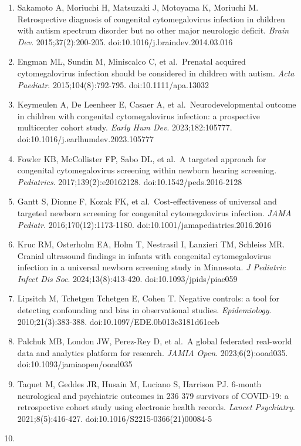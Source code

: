 \documentclass[11pt]{article}
\begin{document}
{\begin{enumerate}
  2018;48(5):1483-1491. doi:10.1007/s10803-017-3412-x
\item
  Sakamoto A, Moriuchi H, Matsuzaki J, Motoyama K, Moriuchi M. Retrospective diagnosis of congenital cytomegalovirus infection in children with autism spectrum disorder but no other major neurologic
  deficit. \emph{Brain Dev}. 2015;37(2):200-205. doi:10.1016/j.braindev.2014.03.016
\item
  Engman ML, Sundin M, Miniscalco C, et al.~Prenatal acquired cytomegalovirus infection should be considered in children with autism. \emph{Acta Paediatr}. 2015;104(8):792-795. doi:10.1111/apa.13032
\item
  Keymeulen A, De Leenheer E, Casaer A, et al.~Neurodevelopmental outcome in children with congenital cytomegalovirus infection: a prospective multicenter cohort study. \emph{Early Hum Dev}.
  2023;182:105777. doi:10.1016/j.earlhumdev.2023.105777
\item
  Fowler KB, McCollister FP, Sabo DL, et al.~A targeted approach for congenital cytomegalovirus screening within newborn hearing screening. \emph{Pediatrics}. 2017;139(2):e20162128.
  doi:10.1542/peds.2016-2128
\item
  Gantt S, Dionne F, Kozak FK, et al.~Cost-effectiveness of universal and targeted newborn screening for congenital cytomegalovirus infection. \emph{JAMA Pediatr}. 2016;170(12):1173-1180.
  doi:10.1001/jamapediatrics.2016.2016
\item
  Kruc RM, Osterholm EA, Holm T, Nestrasil I, Lanzieri TM, Schleiss MR. Cranial ultrasound findings in infants with congenital cytomegalovirus infection in a universal newborn screening study in
  Minnesota. \emph{J Pediatric Infect Dis Soc}. 2024;13(8):413-420. doi:10.1093/jpids/piae059
\item
  Lipsitch M, Tchetgen Tchetgen E, Cohen T. Negative controls: a tool for detecting confounding and bias in observational studies. \emph{Epidemiology}. 2010;21(3):383-388.
  doi:10.1097/EDE.0b013e3181d61eeb
\item
  Palchuk MB, London JW, Perez-Rey D, et al.~A global federated real-world data and analytics platform for research. \emph{JAMIA Open}. 2023;6(2):ooad035. doi:10.1093/jamiaopen/ooad035
\item
  Taquet M, Geddes JR, Husain M, Luciano S, Harrison PJ. 6-month neurological and psychiatric outcomes in 236 379 survivors of COVID-19: a retrospective cohort study using electronic health records.
  \emph{Lancet Psychiatry}. 2021;8(5):416-427. doi:10.1016/S2215-0366(21)00084-5
\item

\end{enumerate}}
\end{document}
